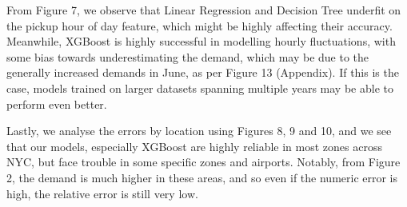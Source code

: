 \documentclass[11pt]{article}
\begin{document}
From Figure 7, we observe that Linear Regression and Decision Tree underfit on the pickup hour of day feature, which might be highly affecting their accuracy. Meanwhile, XGBoost is highly successful in modelling hourly fluctuations, with some bias towards underestimating the demand, which may be due to the generally increased demands in June, as per Figure 13 (Appendix). If this is the case, models trained on larger datasets spanning multiple years may be able to perform even better.
\begin{figure}[H]
\begin{floatrow}
\end{floatrow}
\end{figure}

Lastly, we analyse the errors by location using Figures 8, 9 and 10, and we see that our models, especially XGBoost are highly reliable in most zones across NYC, but face trouble in some specific zones and airports. Notably, from Figure 2, the demand is much higher in these areas, and so even if the numeric error is high, the relative error is still very low.
\end{document}
